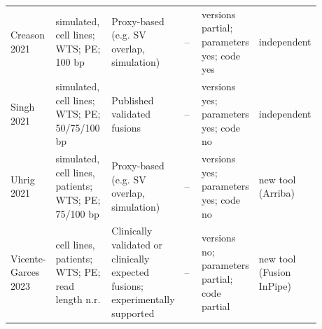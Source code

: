 \begin{table}[!htbp]
\begin{tabular}{p{0.11\linewidth}p{0.2\linewidth}p{0.2\linewidth}p{0.08\linewidth}p{0.16\linewidth}p{0.13\linewidth}}
Creason 2021 & simulated, cell lines; WTS; PE; 100 bp & Proxy-based (e.g. SV overlap, simulation) & -- & versions partial; parameters yes; code yes & independent \\
Singh 2021 & simulated, cell lines; WTS; PE; 50/75/100 bp & Published validated fusions & -- & versions yes; parameters yes; code no & independent \\
Uhrig 2021 & simulated, cell lines, patients; WTS; PE; 75/100 bp & Proxy-based (e.g. SV overlap, simulation) & -- & versions yes; parameters yes; code no & new tool (Arriba) \\
Vicente-Garces 2023 & cell lines, patients; WTS; PE; read length n.r. & Clinically validated or clinically expected fusions; experimentally supported & -- & versions no; parameters partial; code partial & new tool (Fusion InPipe) \\
\bottomrule
\end{tabular}
\end{table}
